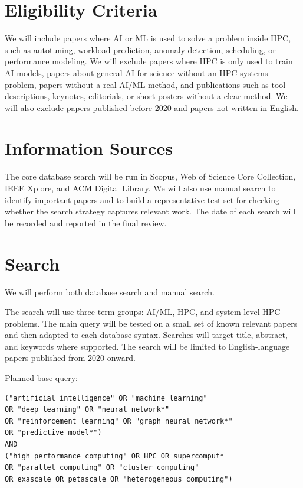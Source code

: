 \documentclass[journal]{IEEEtran}
\begin{document}
\section{Eligibility Criteria}

We will include papers where AI or ML is used to solve a problem inside HPC, such as autotuning, workload prediction, anomaly detection, scheduling, or performance modeling. We will exclude papers where HPC is only used to train AI models, papers about general AI for science without an HPC systems problem, papers without a real AI/ML method, and publications such as tool descriptions, keynotes, editorials, or short posters without a clear method. We will also exclude papers published before 2020 and papers not written in English.

\section{Information Sources}

The core database search will be run in Scopus, Web of Science Core Collection, IEEE Xplore, and ACM Digital Library. We will also use manual search to identify important papers and to build a representative test set for checking whether the search strategy captures relevant work. The date of each search will be recorded and reported in the final review.

\section{Search}

We will perform both database search and manual search.

The search will use three term groups: AI/ML, HPC, and system-level HPC problems. The main query will be tested on a small set of known relevant papers and then adapted to each database syntax. Searches will target title, abstract, and keywords where supported. The search will be limited to English-language papers published from 2020 onward.

Planned base query:

\begin{verbatim}
("artificial intelligence" OR "machine learning"
OR "deep learning" OR "neural network*"
OR "reinforcement learning" OR "graph neural network*"
OR "predictive model*")
AND
("high performance computing" OR HPC OR supercomput*
OR "parallel computing" OR "cluster computing"
OR exascale OR petascale OR "heterogeneous computing")
\end{verbatim}
\end{document}
